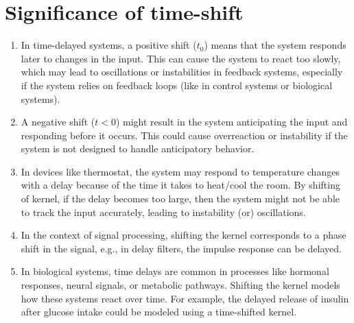 \section{Significance of time-shift}
\begin{enumerate}
\item In time-delayed systems, a positive shift ($t_0$) means that the system responds later to changes in the input. This can cause the system to react too slowly, which may lead to oscillations or instabilities in feedback systems, especially if the system relies on feedback loops (like in control systems or biological systems).
\item A negative shift ($t<0$) might result in the system anticipating the input and responding before it occurs. This could cause overreaction or instability if the system is not designed to handle anticipatory behavior.
\item In devices like thermostat, the system may respond to temperature changes with a delay because of the time it takes to heat/cool the room. By shifting of kernel, if the delay becomes too large, then the system might not be able to track the input accurately, leading to instability (or) oscillations.
\item In the context of signal processing, shifting the kernel corresponds to a phase shift in the signal, e.g., in delay filters, the impulse response can be delayed.
\item In biological systems, time delays are common in processes like hormonal responses, neural signals, or metabolic pathways. Shifting the kernel models how these systems react over time. For example, the delayed release of insulin after glucose intake could be modeled using a time-shifted kernel.

\end{enumerate}
